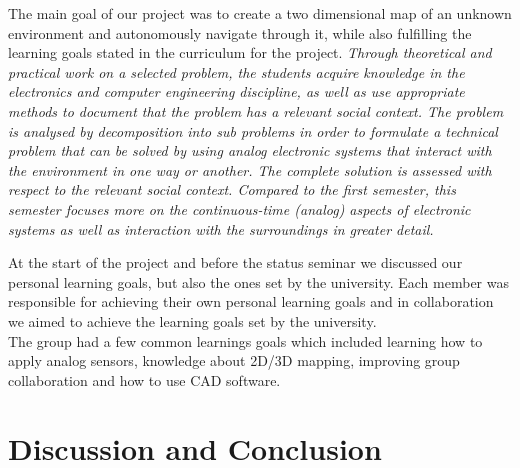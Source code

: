 The main goal of our project was to create a two dimensional map of an unknown environment and autonomously navigate through it, while also fulfilling the learning goals stated in the curriculum for the project.
\textit{Through theoretical and practical work on a selected problem, the
students acquire knowledge in the electronics and computer engineering
discipline, as well as use appropriate methods to document that the
problem has a relevant social context. The problem is analysed by
decomposition into sub problems in order to formulate a technical
problem that can be solved by using analog electronic systems that
interact with the environment in one way or another. The complete
solution is assessed with respect to the relevant social context. Compared
to the first semester, this semester focuses more on the continuous-time
(analog) aspects of electronic systems as well as interaction with the
surroundings in greater detail.}

At the start of the project and before the status seminar we discussed our personal learning goals, but also the ones set by the university.  Each member was responsible for achieving their own personal learning goals and in collaboration we aimed to achieve the learning goals set by the university.\\

The group had a few common learnings goals which included learning how to apply analog sensors, knowledge about 2D/3D mapping, improving group collaboration and how to use CAD software.
\section{Discussion and Conclusion}


